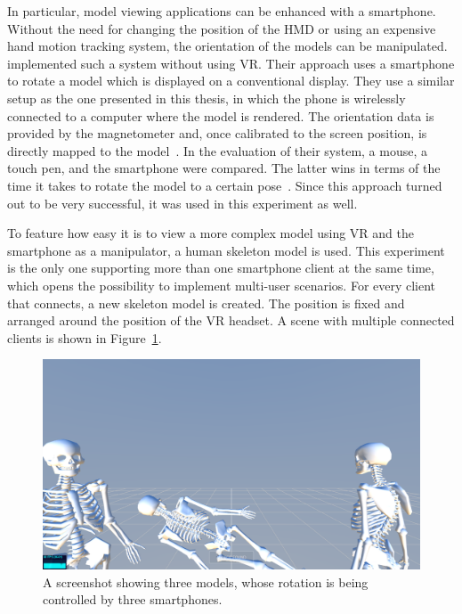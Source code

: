 In particular, model viewing applications can be enhanced with a smartphone. Without the need for changing the position of the \gls{HMD} or using an expensive hand motion tracking system, the orientation of the models can be manipulated.
\citeauthor{Katzakis.2010} implemented such a system without using \gls{VR}. Their approach uses a smartphone to rotate a model which is displayed on a conventional display. They use a similar setup as the one presented in this thesis, in which the phone is wirelessly connected to a computer where the model is rendered. The orientation data is provided by the magnetometer and, once calibrated to the screen position, is directly mapped to the model~\cite[139]{Katzakis.2010}. In the evaluation of their system, a mouse, a touch pen, and the smartphone were compared. The latter wins in terms of the time it takes to rotate the model to a certain pose~\cite[140]{Katzakis.2010}.
Since this approach turned out to be very successful, it was used in this experiment as well.

To feature how easy it is to view a more complex model using \gls{VR} and the smartphone as a manipulator, a human skeleton model is used. This experiment is the only one supporting more than one smartphone client at the same time, which opens the possibility to implement multi-user scenarios. For every client that connects, a new skeleton model is created. The position is fixed and arranged around the position of the \gls{VR} headset. A scene with multiple connected clients is shown in Figure~\ref{fig:screenshot-exp-mv}.

\begin{figure}[H]
	\centering
	\includegraphics[width=12cm]{figures/implementation/screenshot_exp_mv.png}
	\caption[Screenshot of the model viewer]{A screenshot showing three models, whose rotation is being controlled by three smartphones.}\label{fig:screenshot-exp-mv}
\end{figure}

